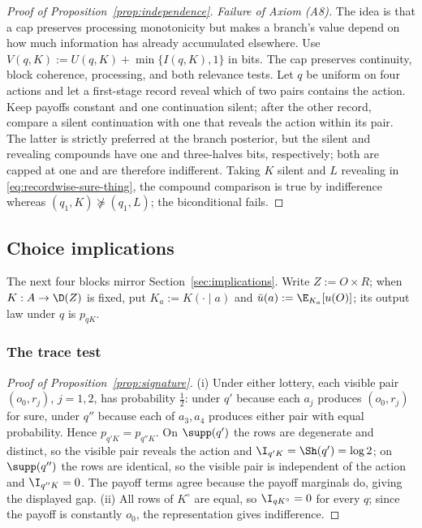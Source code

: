 \begin{proof}[Proof of Proposition~\ref{prop:independence}]
\emph{Failure of Axiom \textup{(A8)}.}
The idea is that a cap preserves processing monotonicity but makes a branch's
value depend on how much information has already accumulated elsewhere.
Use $V(q,K):=U(q,K)+\min\{I(q,K),1\}$ in bits.  The cap preserves continuity, block
coherence, processing, and both relevance tests.  Let $q$ be uniform on four
actions and let a first-stage record reveal which of two pairs contains the
action.  Keep payoffs constant and one continuation silent; after the other
record, compare a silent continuation with one that reveals the action within its pair.  The
latter is strictly preferred at the branch posterior, but the silent and revealing compounds have
one and three-halves bits, respectively; both are capped at one and are therefore indifferent.
Taking $K$ silent and $L$ revealing in
\eqref{eq:recordwise-sure-thing}, the compound comparison is true by
indifference whereas $(q_1,K)\not\succeq(q_1,L)$; the biconditional fails.
\end{proof}

\subsection{Choice implications}\label{app:choice-proofs}

The next four blocks mirror Section~\ref{sec:implications}.  Write
$Z:=O\times R$; when $K:A\to\D(Z)$ is fixed, put
$K_a:=K(\cdot\mid a)$ and
$\bar u(a):=\E_{K_a}[u(O)]$; its output law under $q$ is $p_{qK}$.

\subsubsection{The trace test}\label{app:trace-test-proof}

\begin{proof}[Proof of Proposition~\ref{prop:signature}]
(i) Under either lottery, each visible pair $(o_0,r_j)$, $j=1,2$, has probability $\tfrac12$: under $q'$ because
each $a_j$ produces $(o_0,r_j)$ for sure, under $q''$ because each of $a_3,a_4$ produces either pair with equal
probability.  Hence $p_{q'K}=p_{q''K}$.  On $\supp(q')$ the rows are degenerate and distinct, so the visible pair
reveals the action and $\I_{q'K}=\Sh(q')=\log2$; on $\supp(q'')$ the rows are identical, so the visible pair is
independent of the action and $\I_{q''K}=0$.  The payoff terms agree because the payoff marginals do, giving the
displayed gap.
(ii) All rows of $K^\circ$ are equal, so $\I_{qK^\circ}=0$ for every $q$; since the payoff is constantly $o_0$,
the representation gives indifference.
\end{proof}

